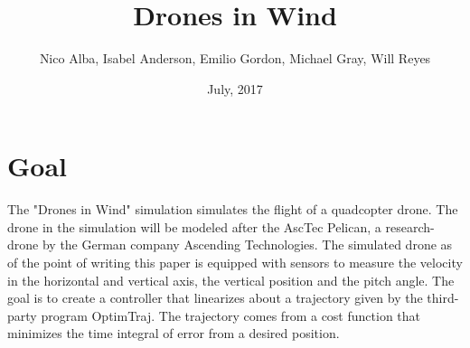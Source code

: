 \documentclass[12pt]{article}
\title{Drones in Wind}
\author{Nico Alba, Isabel Anderson, Emilio Gordon, Michael Gray, Will Reyes}
\date{July, 2017}
\begin{document}
	
	\maketitle
	
	
	\section{Goal}
	The "Drones in Wind" simulation simulates the flight of a quadcopter drone. The drone in the simulation will be modeled after the AscTec Pelican, a research-drone by the German company Ascending Technologies. The simulated drone as of the point of writing this paper is equipped with sensors to measure the velocity in the horizontal and vertical axis, the vertical position and the pitch angle. The goal is to create a controller that linearizes about a trajectory given by the third-party program OptimTraj. The trajectory comes from a cost function that minimizes the time integral of error from a desired position.
\end{document}

